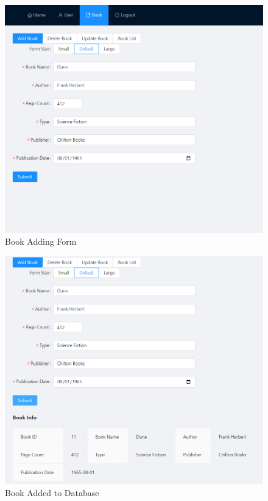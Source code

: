 \begin{minipage}{.49\textwidth}
  \begin{figure}[H]
    \centering
    \includegraphics[width=\linewidth]{img/front-end/add-book-form.png}
    \caption{Book Adding Form}
  \end{figure}
\end{minipage}
\begin{minipage}{.49\textwidth}
  \begin{figure}[H]
    \centering
    \includegraphics[width=\linewidth]{img/front-end/add-book-added.png}
    \caption{Book Added to Database}
  \end{figure}
\end{minipage}


